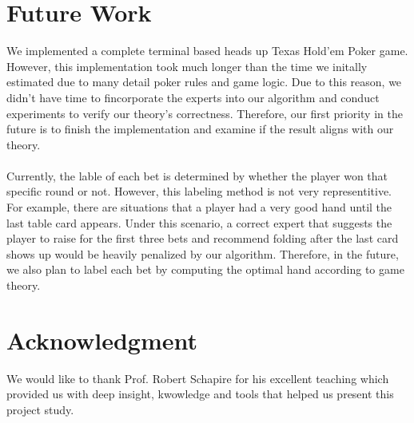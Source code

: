 \documentclass[12pt]{article}
\begin{document}
\section{Future Work}
We implemented a complete terminal based heads up Texas Hold'em Poker game. However, this implementation took much longer than the time we initally estimated due to many detail poker rules and game logic. Due to this reason, we didn't have time to fincorporate the experts into our algorithm and conduct experiments to verify our theory's correctness. Therefore, our first priority in the future is to finish the implementation and examine if the result aligns with our theory.
\\
\\
Currently, the lable of each bet is determined by whether the player won that specific round or not. However, this labeling method is not very representitive. For example, there are situations that a player had a very good hand until the last table card appears. Under this scenario, a correct expert that suggests the player to raise for the first three bets and recommend folding after the last card shows up would be heavily penalized by our algorithm. Therefore, in the future, we also plan to label each bet by computing the optimal hand according to game theory. 



\section*{Acknowledgment}
\noindent We would like to thank Prof. Robert Schapire for his excellent teaching which provided us with deep insight, kwowledge and tools that helped us present this project study.



\end{document}
